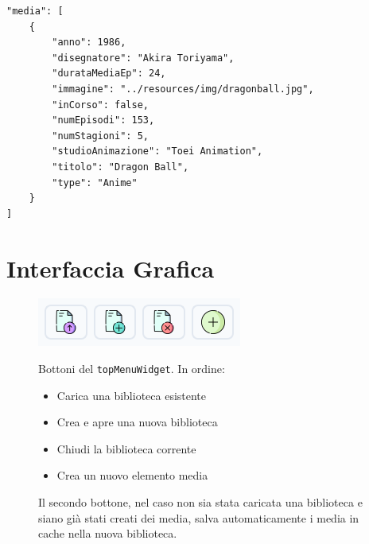 \documentclass[a4paper,12pt]{article}
\begin{document}
\begin{lstlisting}[style=jsonstyle]
"media": [
    {
        "anno": 1986,
        "disegnatore": "Akira Toriyama",
        "durataMediaEp": 24,
        "immagine": "../resources/img/dragonball.jpg",
        "inCorso": false,
        "numEpisodi": 153,
        "numStagioni": 5,
        "studioAnimazione": "Toei Animation",
        "titolo": "Dragon Ball",
        "type": "Anime"
    }
]
\end{lstlisting}

\newpage

\section{Interfaccia Grafica}
\begin{figure}[ht!]
    \centering
    \begin{minipage}{0.4\textwidth}
        \includegraphics[width=\linewidth]{img/TopButton.png}
    \end{minipage}\hfill
    \begin{minipage}{0.55\textwidth}
        \small
        Bottoni del \texttt{topMenuWidget}.\newline
        In ordine:
        \begin{itemize}
            \item Carica una biblioteca esistente
            \item Crea e apre una nuova biblioteca
            \item Chiudi la biblioteca corrente
            \item Crea un nuovo elemento media
        \end{itemize}
        Il secondo bottone, nel caso non sia stata caricata una biblioteca e siano già stati creati dei media, salva automaticamente i media in cache nella nuova biblioteca.
    \end{minipage}
\end{figure}
\end{document}
